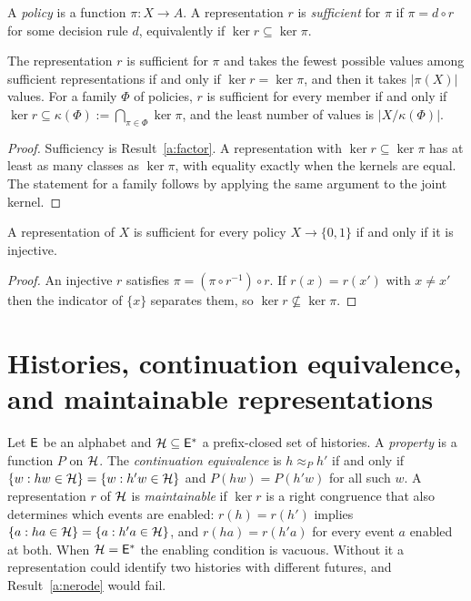 A \emph{policy} is a function $\pi:X\to A$. A representation $r$ is \emph{sufficient} for $\pi$ if $\pi=d\circ r$ for some decision rule $d$, equivalently if $\ker r\subseteq\ker\pi$.

\begin{newresult}\label{a:minimal}
The representation $r$ is sufficient for $\pi$ and takes the fewest possible values among sufficient representations if and only if $\ker r=\ker\pi$, and then it takes $|\pi(X)|$ values. For a family $\Phi$ of policies, $r$ is sufficient for every member if and only if $\ker r\subseteq\kappa(\Phi):=\bigcap_{\pi\in\Phi}\ker\pi$, and the least number of values is $|X/\kappa(\Phi)|$.
\end{newresult}
\begin{proof}
Sufficiency is Result~\ref{a:factor}. A representation with $\ker r\subseteq\ker\pi$ has at least as many classes as $\ker\pi$, with equality exactly when the kernels are equal. The statement for a family follows by applying the same argument to the joint kernel.
\end{proof}

\begin{newresult}\label{a:inj}
A representation of $X$ is sufficient for every policy $X\to\{0,1\}$ if and only if it is injective.
\end{newresult}
\begin{proof}
An injective $r$ satisfies $\pi=(\pi\circ r^{-1})\circ r$. If $r(x)=r(x')$ with $x\ne x'$ then the indicator of $\{x\}$ separates them, so $\ker r\not\subseteq\ker\pi$.
\end{proof}

\section{Histories, continuation equivalence, and maintainable representations}

Let $\mathsf{E}$ be an alphabet and $\mathcal{H}\subseteq\mathsf{E}^{*}$ a prefix-closed set of histories. A \emph{property} is a function $P$ on $\mathcal{H}$. The \emph{continuation equivalence} is $h\approx_Ph'$ if and only if $\{w:hw\in\mathcal{H}\}=\{w:h'w\in\mathcal{H}\}$ and $P(hw)=P(h'w)$ for all such $w$. A representation $r$ of $\mathcal{H}$ is \emph{maintainable} if $\ker r$ is a right congruence that also determines which events are enabled: $r(h)=r(h')$ implies $\{a:ha\in\mathcal{H}\}=\{a:h'a\in\mathcal{H}\}$, and $r(ha)=r(h'a)$ for every event $a$ enabled at both. When $\mathcal{H}=\mathsf{E}^{*}$ the enabling condition is vacuous. Without it a representation could identify two histories with different futures, and Result~\ref{a:nerode} would fail.


